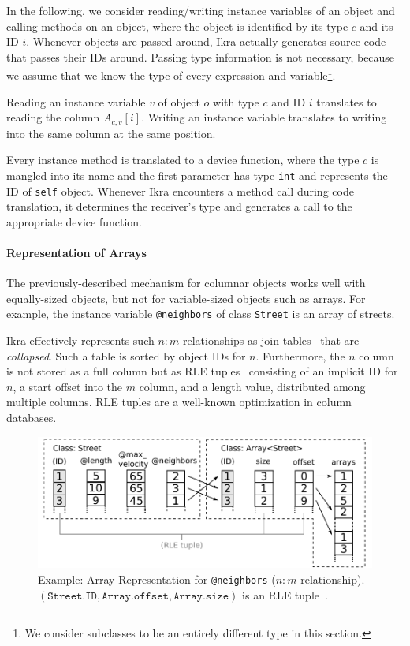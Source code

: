 \documentclass[preprint]{sigplanconf}
\begin{document}
In the following, we consider reading/writing instance variables of an object and calling methods on an object, where the object is identified by its type $c$ and its ID $i$. Whenever objects are passed around, Ikra actually generates source code that passes their IDs around. Passing type information is not necessary, because we assume that we know the type of every expression and variable\footnote{We consider subclasses to be an entirely different type in this section.}.

Reading an instance variable $v$ of object $o$ with type $c$ and ID $i$ translates to reading the column $A_{c,v}[i]$. Writing an instance variable translates to writing into the same column at the same position.

Every instance method is translated to a device function, where the type $c$ is mangled into its name and the first parameter has type \texttt{int} and represents the ID of \texttt{self} object. Whenever Ikra encounters a method call during code translation, it determines the receiver's type and generates a call to the appropriate device function.

\paragraph{Representation of Arrays}
The previously-described mechanism for columnar objects works well with equally-sized objects, but not for variable-sized objects such as arrays. For example, the instance variable \texttt{@neighbors} of class \texttt{Street} is an array of streets.

Ikra effectively represents such $n:m$ relationships as join tables~\cite{Garcia-Molina:2008:DSC:1450931} that are \emph{collapsed}. Such a table is sorted by object IDs for $n$. Furthermore, the $n$ column is not stored as a full column but as RLE tuples~\cite{Abadi:2006:ICE:1142473.1142548} consisting of an implicit ID for $n$, a start offset into the $m$ column, and a length value, distributed among multiple columns. RLE tuples are a well-known optimization in column databases.

\begin{figure}[!htp]
    \centering
    \includegraphics[width=\columnwidth]{column_access.pdf}
    \caption{Example: Array Representation for \texttt{@neighbors} ($n:m$ relationship). $(\texttt{Street.ID}, \texttt{Array.offset}, \texttt{Array.size})$ is an RLE tuple~\cite{Abadi:2006:ICE:1142473.1142548}.}
    \label{fig:array_repr}
\end{figure}
\end{document}
